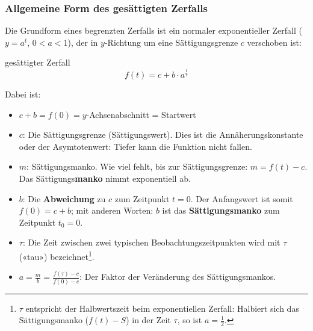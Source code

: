 \subsubsection{Allgemeine Form des gesättigten Zerfalls}
\begin{center}
\end{center}

Die Grundform eines begrenzten Zerfalls ist ein normaler
exponentieller Zerfall ($y=a^{t}$, $0<a<1$), der in $y$-Richtung um eine Sättigungsgrenze $c$ verschoben ist:

\begin{definition}{gesättigter Zerfall}{}
$$f(t) = c + b\cdot{}a^{\frac{t}{\tau}}$$
\end{definition}

Dabei ist:
\begin{itemize}
  \item $c+b = f(0) = y$-Achsenabschnitt = Startwert
	\item $c$: Die Sättigungsgrenze (Sättigungswert). Dies ist die Annäherungskonstante oder der Asymtotenwert: Tiefer kann die Funktion nicht fallen.

	\item $m$:  Sättigungsmanko. Wie viel fehlt, bis zur
    Sättigungsgrenze: $m = f(t) - c$. Das Sättigungs\textbf{manko} nimmt exponentiell ab.
	\item $b$: Die \textbf{Abweichung} zu $c$ zum Zeitpunkt $t=0$. Der
    Anfangswert ist somit $f(0) = c + b$; mit anderen Worten: $b$ ist das
    \textbf{Sättigungsmanko} zum Zeitpunkt $t_0 = 0$.
	\item $\tau$: Die Zeit zwischen zwei typischen Beobachtungszeitpunkten wird
    mit $\tau$ («tau») bezeichnet\footnote{$\tau$ entspricht der
      Halbwertszeit beim exponentiellen Zerfall: Halbiert sich das
      Sättigungsmanko ($f(t)-S$) in der Zeit $\tau$, so ist $a=\frac12$.}.
    \item $a=\frac{m}{b}=\frac{f(\tau)-c}{f(0)-c}$: Der Faktor der Veränderung des
      Sättigungsmankos.
\end{itemize}

